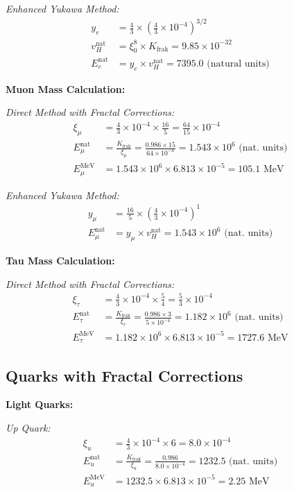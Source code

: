 \documentclass[12pt,a4paper]{article}
\begin{document}
\textit{Enhanced Yukawa Method:}
\begin{align}
	y_e &= \frac{4}{3} \times \left(\frac{4}{3} \times 10^{-4}\right)^{3/2} \\
	v_H^{\text{nat}} &= \xi_0^8 \times K_{\text{frak}} = 9.85 \times 10^{-32} \\
	E_e^{\text{nat}} &= y_e \times v_H^{\text{nat}} = 7395.0 \text{ (natural units)}
\end{align}

\textbf{Muon Mass Calculation:}

\textit{Direct Method with Fractal Corrections:}
\begin{align}
	\xi_\mu &= \frac{4}{3} \times 10^{-4} \times \frac{16}{5} = \frac{64}{15} \times 10^{-4} \\
	E_{\mu}^{\text{nat}} &= \frac{K_{\text{frak}}}{\xi_\mu} = \frac{0.986 \times 15}{64 \times 10^{-4}} 
	= 1.543 \times 10^6 \text{ (nat. units)} \\
	E_\mu^{\text{MeV}} &= 1.543 \times 10^6 \times 6.813 \times 10^{-5} = 105.1 \text{ MeV}
\end{align}

\textit{Enhanced Yukawa Method:}
\begin{align}
	y_\mu &= \frac{16}{5} \times \left(\frac{4}{3} \times 10^{-4}\right)^1 \\
	E_\mu^{\text{nat}} &= y_\mu \times v_H^{\text{nat}} = 1.543 \times 10^6 \text{ (nat. units)}
\end{align}

\textbf{Tau Mass Calculation:}

\textit{Direct Method with Fractal Corrections:}
\begin{align}
	\xi_\tau &= \frac{4}{3} \times 10^{-4} \times \frac{5}{4} = \frac{5}{3} \times 10^{-4} \\
	E_{\tau}^{\text{nat}} &= \frac{K_{\text{frak}}}{\xi_\tau} = \frac{0.986 \times 3}{5 \times 10^{-4}} 
	= 1.182 \times 10^6 \text{ (nat. units)} \\
	E_\tau^{\text{MeV}} &= 1.182 \times 10^6 \times 6.813 \times 10^{-5} = 1727.6 \text{ MeV}
\end{align}

\subsection{Quarks with Fractal Corrections}
\label{subsec:quarks_enhanced}

\textbf{Light Quarks:}

\textit{Up Quark:}
\begin{align}
	\xi_u &= \frac{4}{3} \times 10^{-4} \times 6 = 8.0 \times 10^{-4} \\
	E_u^{\text{nat}} &= \frac{K_{\text{frak}}}{\xi_u} = \frac{0.986}{8.0 \times 10^{-4}} 
	= 1232.5 \text{ (nat. units)} \\
	E_u^{\text{MeV}} &= 1232.5 \times 6.813 \times 10^{-5} = 2.25 \text{ MeV}
\end{align}
\end{document}

